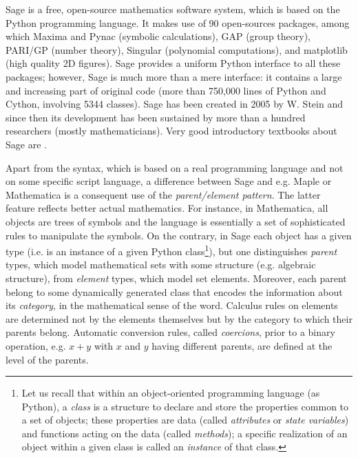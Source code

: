 \documentclass[a4paper]{jpconf}
\newcommand{\soft}[1]{\textsf{#1}}
\newcommand{\Sage}{\soft{Sage}}
\begin{document}
\Sage{} \cite{sage} is a free, open-source mathematics software system, which is
based on the Python programming language. It makes use of 90 open-sources packages, 
among which \soft{Maxima} and \soft{Pynac} (symbolic calculations),
\soft{GAP} (group theory), 
\soft{PARI/GP} (number theory), \soft{Singular} (polynomial computations), 
and \soft{matplotlib} (high quality 2D figures). 
\Sage{} provides a uniform Python interface to all these packages; however, 
\Sage{} is much more than a mere interface: it contains a large and increasing part of 
original code (more than 750,000 lines of Python and Cython, involving 5344 classes). 
\Sage{} has been created in 2005 by W. Stein \cite{SteinJ05} and since
then its development has been sustained by more than a hundred researchers
(mostly mathematicians). Very good introductory textbooks about \Sage{} are
\cite{JoyneS14,Zimme13,Bard15}. 
 
Apart from the syntax, which is based on a real programming language and not on some specific script 
language, a difference between \Sage{} and e.g. \soft{Maple} or \soft{Mathematica}
is a consequent use of the \emph{parent/element pattern}. The latter  
feature reflects better actual mathematics. 
For instance, in \soft{Mathematica}, all objects 
are trees of symbols and the language is essentially a set of 
sophisticated rules to manipulate the symbols. On the contrary, in \Sage{}
each object has a given type (i.e. is an instance of a given
Python class\footnote{Let us
recall that within an object-oriented programming language (as Python),
a \emph{class} is a structure to declare and store the
properties common to a set of objects; these properties 
are data (called 
\emph{attributes} or \emph{state variables}) and functions acting 
on the data (called \emph{methods}); a specific realization of an object 
within a given class is called an \emph{instance} of that class.}), 
but one distinguishes \emph{parent} types, which model mathematical
sets with some structure (e.g. algebraic structure), from \emph{element} types,
which model set elements. Moreover, each parent belong to some 
dynamically generated class that encodes the information 
about its \emph{category}, in the mathematical sense of the word.
Calculus rules on elements are determined not by the elements themselves
but by the category to which their parents belong. Automatic conversion rules, called \emph{coercions},
prior to a binary operation, e.g. $x+y$ with $x$ and $y$ having different 
parents, are defined at the level of the parents.
\end{document}
